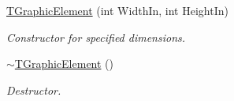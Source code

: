 \begin{DoxyCompactItemize}
\mbox{\label{class_t_graphic_element_a3d9336aecdb5c05c0d96485d896c8d24}} 
\mbox{\hyperlink{class_t_graphic_element_a3d9336aecdb5c05c0d96485d896c8d24}{T\+Graphic\+Element}} (int Width\+In, int Height\+In)
\begin{DoxyCompactList}\small\item\em Constructor for specified dimensions. \end{DoxyCompactList}\item 
\mbox{\label{class_t_graphic_element_af7a475400bc15a5ab41bf1b3d345dc31}} 
\mbox{\hyperlink{class_t_graphic_element_af7a475400bc15a5ab41bf1b3d345dc31}{$\sim$\+T\+Graphic\+Element}} ()
\begin{DoxyCompactList}\small\item\em Destructor. \end{DoxyCompactList}\end{DoxyCompactItemize}
